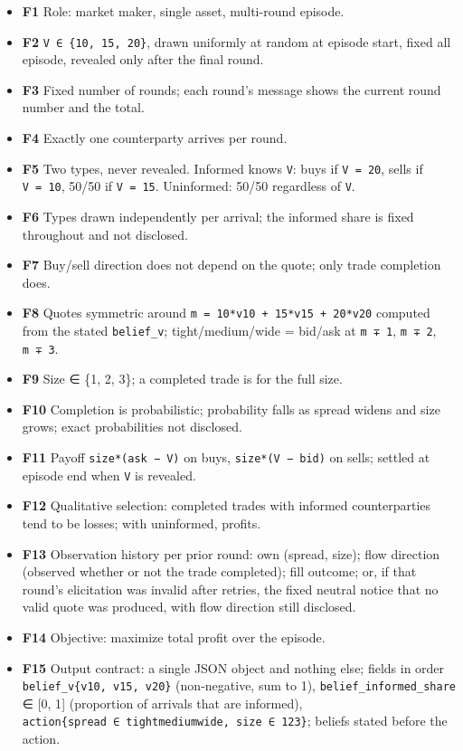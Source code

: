 \documentclass[
  11pt,
]{article}
\providecommand{\tightlist}{%
  \setlength{\itemsep}{0pt}\setlength{\parskip}{0pt}}
\begin{document}
\begin{itemize}
\tightlist
\item
  \textbf{F1} Role: market maker, single asset, multi-round episode.
\item
  \textbf{F2} \texttt{V\ ∈\ \{10,\ 15,\ 20\}}, drawn uniformly at random at episode start, fixed all episode, revealed only after the final round.
\item
  \textbf{F3} Fixed number of rounds; each round's message shows the current round number and the total.
\item
  \textbf{F4} Exactly one counterparty arrives per round.
\item
  \textbf{F5} Two types, never revealed. Informed knows \texttt{V}: buys if \texttt{V\ =\ 20}, sells if \texttt{V\ =\ 10}, 50/50 if \texttt{V\ =\ 15}. Uninformed: 50/50 regardless of \texttt{V}.
\item
  \textbf{F6} Types drawn independently per arrival; the informed share is fixed throughout and not disclosed.
\item
  \textbf{F7} Buy/sell direction does not depend on the quote; only trade completion does.
\item
  \textbf{F8} Quotes symmetric around \texttt{m\ =\ 10*v10\ +\ 15*v15\ +\ 20*v20} computed from the stated \texttt{belief\_v}; tight/medium/wide = bid/ask at \texttt{m\ ∓\ 1}, \texttt{m\ ∓\ 2}, \texttt{m\ ∓\ 3}.
\item
  \textbf{F9} Size ∈ \{1, 2, 3\}; a completed trade is for the full size.
\item
  \textbf{F10} Completion is probabilistic; probability falls as spread widens and size grows; exact probabilities not disclosed.
\item
  \textbf{F11} Payoff \texttt{size*(ask\ −\ V)} on buys, \texttt{size*(V\ −\ bid)} on sells; settled at episode end when \texttt{V} is revealed.
\item
  \textbf{F12} Qualitative selection: completed trades with informed counterparties tend to be losses; with uninformed, profits.
\item
  \textbf{F13} Observation history per prior round: own (spread, size); flow direction (observed whether or not the trade completed); fill outcome; or, if that round's elicitation was invalid after retries, the fixed neutral notice that no valid quote was produced, with flow direction still disclosed.
\item
  \textbf{F14} Objective: maximize total profit over the episode.
\item
  \textbf{F15} Output contract: a single JSON object and nothing else; fields in order \texttt{belief\_v\{v10,\ v15,\ v20\}} (non-negative, sum to 1), \texttt{belief\_informed\_share} ∈ {[}0, 1{]} (proportion of arrivals that are informed), \texttt{action\{spread\ ∈\ tight\textbar{}medium\textbar{}wide,\ size\ ∈\ 1\textbar{}2\textbar{}3\}}; beliefs stated before the action.
\end{itemize}
\end{document}
